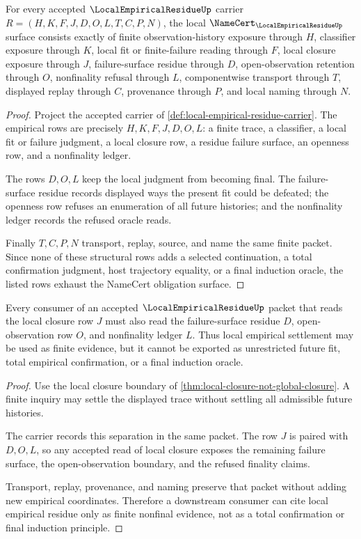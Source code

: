 \begin{theorem}
\label{thm:local-empirical-residue-namecert-obligations}
For every accepted $\LocalEmpiricalResidueUp$ carrier $R=(H,K,F,J,D,O,L,T,C,P,N)$, the local $\NameCert_{\LocalEmpiricalResidueUp}$ surface consists exactly of finite observation-history exposure through $H$, classifier exposure through $K$, local fit or finite-failure reading through $F$, local closure exposure through $J$, failure-surface residue through $D$, open-observation retention through $O$, nonfinality refusal through $L$, componentwise transport through $T$, displayed replay through $C$, provenance through $P$, and local naming through $N$.
\end{theorem}
\begin{proof}
Project the accepted carrier of \autoref{def:local-empirical-residue-carrier}. The empirical rows are precisely $H,K,F,J,D,O,L$: a finite trace, a classifier, a local fit or failure judgment, a local closure row, a residue failure surface, an openness row, and a nonfinality ledger.

The rows $D,O,L$ keep the local judgment from becoming final. The failure-surface residue records displayed ways the present fit could be defeated; the openness row refuses an enumeration of all future histories; and the nonfinality ledger records the refused oracle reads.

Finally $T,C,P,N$ transport, replay, source, and name the same finite packet. Since none of these structural rows adds a selected continuation, a total confirmation judgment, host trajectory equality, or a final induction oracle, the listed rows exhaust the NameCert obligation surface.
\end{proof}

\begin{theorem}
\label{thm:local-empirical-residue-nonfinality}
Every consumer of an accepted $\LocalEmpiricalResidueUp$ packet that reads the local closure row $J$ must also read the failure-surface residue $D$, open-observation row $O$, and nonfinality ledger $L$. Thus local empirical settlement may be used as finite evidence, but it cannot be exported as unrestricted future fit, total empirical confirmation, or a final induction oracle.
\end{theorem}
\begin{proof}
Use the local closure boundary of \autoref{thm:local-closure-not-global-closure}. A finite inquiry may settle the displayed trace without settling all admissible future histories.

The carrier records this separation in the same packet. The row $J$ is paired with $D,O,L$, so any accepted read of local closure exposes the remaining failure surface, the open-observation boundary, and the refused finality claims.

Transport, replay, provenance, and naming preserve that packet without adding new empirical coordinates. Therefore a downstream consumer can cite local empirical residue only as finite nonfinal evidence, not as a total confirmation or final induction principle.
\end{proof}

